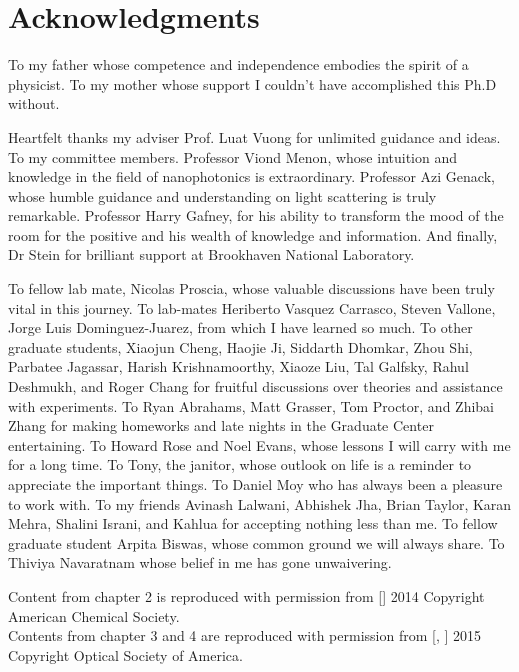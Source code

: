 \nobibliography*
\chapter*{Acknowledgments}

To my father whose competence and independence embodies the spirit of a physicist. To my mother whose support I couldn't have accomplished this Ph.D without.

Heartfelt thanks my adviser Prof. Luat Vuong for unlimited guidance and ideas.
To my committee members. Professor Viond Menon, whose intuition and knowledge in the field of nanophotonics is extraordinary.
Professor Azi Genack, whose humble guidance and understanding on light scattering is truly remarkable.
Professor Harry Gafney, for his ability to transform the mood of the room for the positive and his wealth of knowledge and information.
And finally, Dr Stein for brilliant support at Brookhaven National Laboratory. 

To fellow lab mate, Nicolas Proscia, whose valuable discussions have been truly vital in this journey. 
To lab-mates Heriberto Vasquez Carrasco, Steven Vallone, Jorge Luis Dominguez-Juarez, from which I have learned so much.
To other graduate students, Xiaojun Cheng, Haojie Ji, Siddarth Dhomkar, Zhou Shi, Parbatee Jagassar, Harish Krishnamoorthy, Xiaoze Liu, Tal Galfsky, Rahul Deshmukh, and Roger Chang for fruitful discussions over theories and assistance with experiments.
To Ryan Abrahams, Matt Grasser, Tom Proctor, and Zhibai Zhang for making homeworks and late nights in the Graduate Center entertaining.
To Howard Rose and Noel Evans, whose lessons I will carry with me for a long time.
To Tony, the janitor, whose outlook on life is a reminder to appreciate the important things. To Daniel Moy who has always been a pleasure to work with.
To my friends Avinash Lalwani, Abhishek Jha, Brian Taylor, Karan Mehra, Shalini Israni, and Kahlua for accepting nothing less than me.
To fellow graduate student Arpita Biswas, whose common ground we will always share.
To Thiviya Navaratnam whose belief in me has gone unwaivering.


Content from chapter 2 is reproduced with permission from [] 2014 Copyright American Chemical Society.\\
Contents from chapter 3 and 4 are reproduced with permission from [, ] 2015 Copyright Optical Society of America.